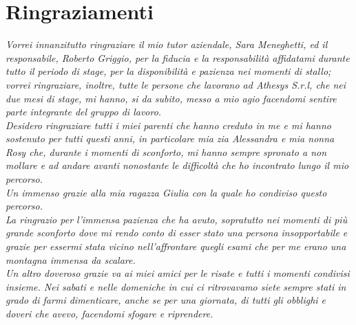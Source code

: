
\cleardoublepage
{}
{}



\bigskip

\begingroup
\let\clearpage\relax
\let\cleardoublepage\relax
\let\cleardoublepage\relax

\chapter*{Ringraziamenti}

\noindent \textit{Vorrei innanzitutto ringraziare il mio tutor aziendale, Sara Meneghetti, ed il responsabile, Roberto Griggio, per la fiducia e la responsabilità affidatami durante tutto il periodo di stage, per la disponibilità e pazienza nei momenti di stallo; vorrei ringraziare, inoltre, tutte le persone che lavorano ad Athesys S.r.l, che nei due mesi di stage, mi hanno, si da subito, messo a mio agio facendomi sentire parte integrante del gruppo di lavoro.}\\

\noindent \textit{Desidero ringraziare tutti i miei parenti che hanno creduto in me e mi hanno sostenuto per tutti questi anni, in particolare mia zia Alessandra e mia nonna Rosy che, durante i momenti di sconforto, mi hanno sempre spronato a non mollare e ad andare avanti nonostante le difficoltà che ho incontrato lungo il mio percorso.}\\

\noindent \textit{Un immenso grazie alla mia ragazza Giulia con la quale ho condiviso questo percorso.\\
La ringrazio per l'immensa pazienza che ha avuto, sopratutto nei momenti di più grande sconforto dove mi rendo conto di esser stato una persona insopportabile e grazie per essermi stata vicino nell'affrontare quegli esami che per me erano una montagna immensa da scalare.}\\

\noindent \textit{Un altro doveroso grazie va ai miei amici per le risate e tutti i momenti condivisi insieme. Nei sabati e nelle domeniche in cui ci ritrovavamo siete sempre stati in grado di farmi dimenticare, anche se per una giornata, di tutti gli obblighi e doveri che avevo, facendomi sfogare e riprendere.}\\

